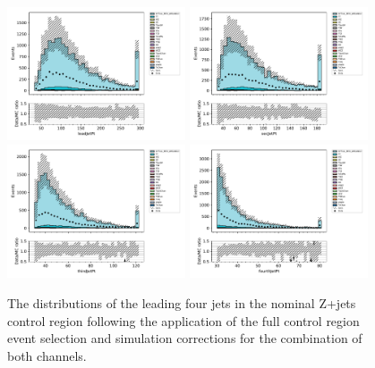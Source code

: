 \begin{figure}[tbp]
\centering
\includegraphics[width=0.47\textwidth]{figs/tzq-fullSelection-plots/plots_ee_zPlus/leadJetPt.pdf}
\includegraphics[width=0.47\textwidth]{figs/tzq-fullSelection-plots/plots_ee_zPlus/secJetPt.pdf}
\\
\includegraphics[width=0.47\textwidth]{figs/tzq-fullSelection-plots/plots_ee_zPlus/thirdJetPt.pdf}
\includegraphics[width=0.47\textwidth]{figs/tzq-fullSelection-plots/plots_ee_zPlus/fourthJetPt.pdf}
\caption{
The distributions of the leading four jets \pt in the nominal Z+jets control region following the application of the full control region event selection and simulation corrections for the combination of both channels.
}
\label{fig:zPlusCR_jetPt}
\end{figure}


